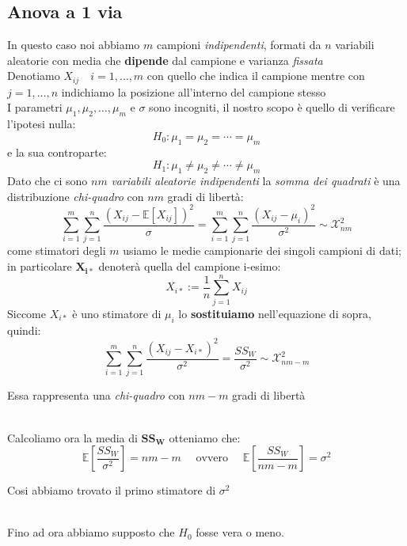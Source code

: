 \documentclass[]{article}
\newcommand{\ev}{\mathbb{E}[X]}
\renewcommand{\ev}[1]{\mathbb{E}\left[#1\right]}
\begin{document}
    \subsection{Anova a 1 via}
    In questo caso noi abbiamo $m$ campioni \textit{indipendenti}, formati da $n$ variabili aleatorie con media che \textbf{dipende} dal campione e varianza \textit{fissata} \\
    Denotiamo $X_{ij} \quad i = 1,\ldots, m$ con quello che indica il campione mentre con $j=1, \ldots, n$ indichiamo la posizione all'interno del campione stesso \\[2ex] 
    I parametri $\mu_1, \mu_2, \ldots, \mu_m$ e $\sigma$ sono incogniti, il nostro scopo è quello di verificare l'ipotesi nulla:
    \[ H_0 : \mu_1 = \mu_2 = \cdots = \mu_m \]
    e la sua controparte:
    \[ H_1 : \mu_1 \not= \mu_2 \not= \cdots \not= \mu_m \]
    Dato che ci sono $nm$ \textit{variabili aleatorie indipendenti} la \textit{somma dei quadrati} è una distribuzione \textit{chi-quadro} con $nm$ gradi di libertà:
    \[ \sum_{i=1}^{m} \sum_{j=1}^{n} \frac{(X_{ij} - \ev{X_{ij}})^2}{\sigma} = \sum_{i=1}^{m} \sum_{j=1}^{n} \frac{(X_{ij} - \mu_i)^2}{\sigma^2} \sim \mathcal{X}^2_{nm} \]
    come stimatori degli $m$ usiamo le medie campionarie dei singoli campioni di dati; in particolare $\boldsymbol{X_{i*}}$ denoterà quella del campione i-esimo:
    \[ X_{i*} := \frac{1}{n} \sum_{j=1}^{n} X_{ij} \]
    Siccome $X_{i*}$ è uno stimatore di $\mu_i$ lo \textbf{sostituiamo} nell'equazione di sopra, quindi:
    \[ \sum_{i=1}^{m} \sum_{j=1}^{n} \frac{(X_{ij} - X_{i*})^2}{\sigma^2} = \frac{SS_W}{\sigma^2} \sim \mathcal{X}^2_{nm - m} \]
    \centerline{Essa rappresenta una \textit{chi-quadro} con $nm-m$ gradi di libertà} \\[2ex]
    Calcoliamo ora la media di $\boldsymbol{SS_W}$ otteniamo che:\
    \[ \ev{\frac{SS_W}{\sigma^2}} = nm - m \quad \text{ ovvero } \quad \ev{\frac{SS_W}{nm-m}} = \sigma^2 \]
    \centerline{Cosi abbiamo trovato il primo stimatore di $\sigma^2$} \\[2ex]
    Fino ad ora abbiamo supposto che $H_0$ fosse vera o meno.
\end{document}
